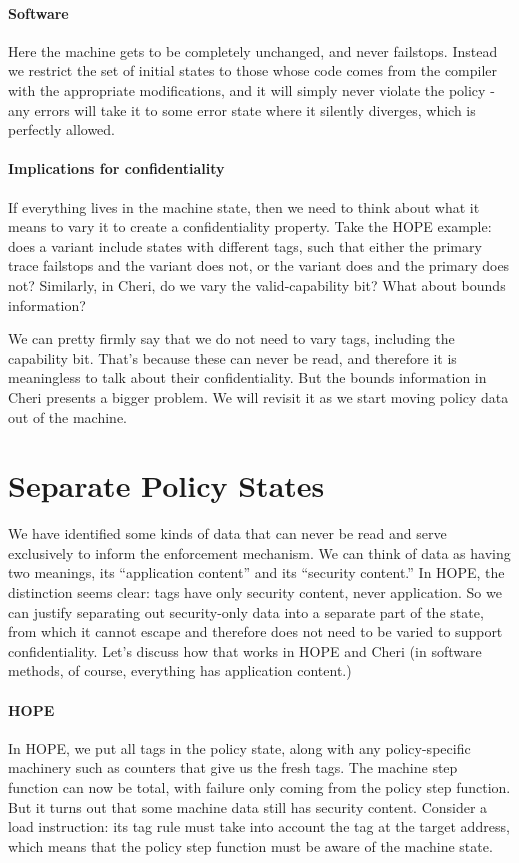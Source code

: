 \documentclass{article}
\begin{document}
\paragraph*{Software} Here the machine gets to be completely unchanged, and never failstops. Instead
we restrict the set of initial states to those whose code comes from the compiler with the appropriate
modifications, and it will simply never violate the policy - any errors will take it to some error
state where it silently diverges, which is perfectly allowed.

\paragraph*{Implications for confidentiality} If everything lives in the machine state, then
we need to think about what it means to vary it to create a confidentiality property. Take the HOPE
example: does a variant include states with different tags, such that either the primary
trace failstops and the variant does not, or the variant does and the primary does not? Similarly,
in Cheri, do we vary the valid-capability bit? What about bounds information?

We can pretty firmly say that we do not need to vary tags, including the capability bit. That's
because these can never be read, and therefore it is meaningless to talk about their confidentiality.
But the bounds information in Cheri presents a bigger problem. We will revisit it as we start moving
policy data out of the machine.

\section{Separate Policy States}

We have identified some kinds of data that can never be read and serve exclusively to inform
the enforcement mechanism. We can think of data as having two meanings, its ``application content'' and its
``security content.'' In HOPE, the distinction seems clear: tags have only security content, never application.
So we can justify separating out security-only data into a separate part of the state, from which it cannot
escape and therefore does not need to be varied to support confidentiality. Let's discuss how that
works in HOPE and Cheri (in software methods, of course, everything has application content.)

\paragraph*{HOPE} In HOPE, we put all tags in the policy state, along with any policy-specific machinery such as
counters that give us the fresh tags. The machine step function can now be total, with failure only
coming from the policy step function. But it turns out that some machine data still has security content.
Consider a load instruction: its tag rule must take into account the tag at the target address, which
means that the policy step function must be aware of the machine state.
\end{document}
